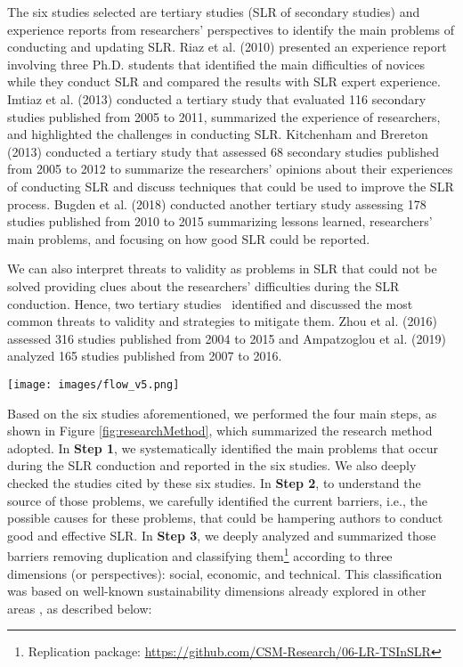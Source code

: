 \documentclass{article}
\begin{document}
The six studies selected are tertiary studies (SLR of secondary studies) and experience reports from researchers' perspectives to identify the main problems of conducting and updating SLR. Riaz et al. (2010) \cite{Riaz2010} presented an experience report involving three Ph.D. students that identified the main difficulties of novices while they conduct SLR and compared the results with SLR expert experience. Imtiaz et al. (2013) \cite{Imtiaz2013} conducted a tertiary study that evaluated 116 secondary studies published from 2005 to 2011, summarized the experience of researchers, and highlighted the challenges in conducting SLR. Kitchenham and Brereton (2013) \cite{Kitchenham2013} conducted a tertiary study that assessed 68 secondary studies published from 2005 to 2012 to summarize the researchers' opinions about their experiences of conducting SLR and discuss techniques that could be used to improve the SLR process. Bugden et al. (2018) \cite{Budgen2018Reporting} conducted another tertiary study assessing 178 studies published from 2010 to 2015 summarizing lessons learned, researchers' main problems, and focusing on how good SLR could be reported. 

We can also interpret threats to validity as problems in SLR that could not be solved providing clues about the researchers' difficulties during the SLR conduction. Hence, two tertiary studies~\cite{Ampatzoglou2019,Zhou2016Threats} identified and discussed the most common threats to validity and strategies to mitigate them. Zhou et al. (2016) \cite{Zhou2016Threats} assessed 316 studies published from 2004 to 2015 and Ampatzoglou et al. (2019)~\cite{Ampatzoglou2019} analyzed 165 studies published from 2007 to 2016. 
\begin{figure*}[!ht]
    \centering
    \texttt{[image: images/flow\_v5.png]}
    \caption{Research method}
    \label{fig:researchMethod}
\end{figure*}


Based on the six studies aforementioned, we performed the four main steps, as shown in Figure \ref{fig:researchMethod}, which summarized the research method adopted. In \textbf{Step 1}, we systematically identified the main problems that occur during the SLR conduction and reported in the six studies. We also deeply checked the studies cited by these six studies. In \textbf{Step 2}, to understand the source of those problems, we carefully identified the current barriers, i.e., the possible causes for these problems, that could be hampering authors to conduct good and effective SLR. In \textbf{Step 3}, we deeply analyzed and summarized those barriers removing duplication and classifying them\footnote{Replication package: \url{https://github.com/CSM-Research/06-LR-TSInSLR}} according to three dimensions (or perspectives): social, economic, and technical. This classification was based on well-known sustainability dimensions already explored in other areas \cite{Becker2015Sustainability, Hill1997, keeble1988brundtland, Purvis2018three, Spangenberg2002, Soini2014}, as described below: 
\end{document}
